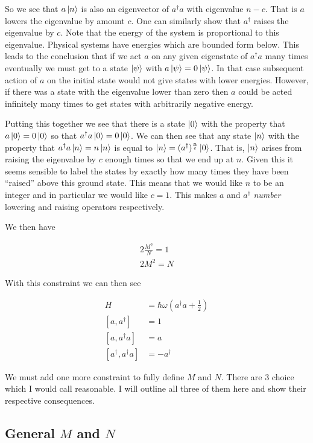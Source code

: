 \documentclass[12pt]{article}
\begin{document}
So we see that $a\ket{n}$ is also an eigenvector of $a^{\dag}a$ with eigenvalue $n-c$. That is $a$ lowers the eigenvalue by amount $c$. One can similarly show that $a^{\dag}$ raises the eigenvalue by $c$. Note that the energy of the system is proportional to this eigenvalue.
Physical systems have energies which are bounded form below. This leads to the conclusion that if we act $a$ on any given eigenstate of $a^{\dag}a$ many times eventually we must get to a state $\ket{\psi}$ with $a\ket{\psi} = 0\ket{\psi}$. In that case subsequent action of $a$ on the initial state would not give states with lower energies. However, if there was a state with the eigenvalue lower than zero then $a$ could be acted infinitely many times to get states with arbitrarily negative energy.

Putting this together we see that there is a state $\ket{0}$ with the property that $a\ket{0} = 0\ket{0}$ so that $a^{\dag}a\ket{0} = 0\ket{0}$. We can then see that any state $\ket{n}$ with the property that $a^{\dag}a\ket{n} = n\ket{n}$ is equal to $\ket{n} = (a^{\dag})^{\frac{n}{c}}\ket{0}$. That is, $\ket{n}$ arises from raising the eigenvalue by $c$ enough times so that we end up at $n$. Given this it seems sensible to label the states by exactly how many times they have been ``raised'' above this ground state. This means that we would like $n$ to be an integer and in particular we would like $c=1$. This makes $a$ and $a^{\dag}$ \textit{number} lowering and raising operators respectively.

We then have

\begin{align}
2\frac{M^2}{N} = 1\\
2M^2 = N
\end{align}

With this constraint we can then see

\begin{align}
H &= \hbar \omega\left(a^{\dag}a + \frac{1}{2}\right)\\
[a,a^{\dag}] &= 1\\
[a,a^{\dag}a] &= a\\
[a^{\dag},a^{\dag}a] &= -a^{\dag}
\end{align}

We must add one more constraint to fully define $M$ and $N$. There are 3 choice which I would call reasonable. I will outline all three of them here and show their respective consequences.

\subsection{General $M$ and $N$}
\end{document}
